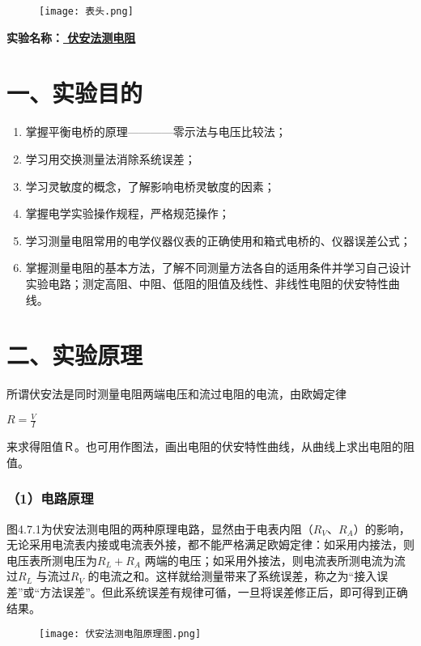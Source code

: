 \documentclass[11pt,a4paper,oneside]{article}
\begin{document}
\begin{figure}[H]
 \centering
  \texttt{[image: 表头.png]}
\end{figure}
\begin{center}
\textbf{{\large 实验名称：\uline{         伏安法测电阻       }}}
\end{center}

\section*{一、实验目的}
\begin{enumerate}
\item 掌握平衡电桥的原理————零示法与电压比较法；
\item 学习用交换测量法消除系统误差；
\item 学习灵敏度的概念，了解影响电桥灵敏度的因素；
\item 掌握电学实验操作规程，严格规范操作；
\item 学习测量电阻常用的电学仪器仪表的正确使用和箱式电桥的、仪器误差公式；
\item 掌握测量电阻的基本方法，了解不同测量方法各自的适用条件并学习自己设计实验电路；测定高阻、中阻、低阻的阻值及线性、非线性电阻的伏安特性曲线。
\end{enumerate}

\section*{二、实验原理}

所谓伏安法是同时测量电阻两端电压和流过电阻的电流，由欧姆定律
\begin{center}
$ R=\displaystyle\frac{V}{I}$
\end{center}
来求得阻值Ｒ。也可用作图法，画出电阻的伏安特性曲线，从曲线上求出电阻的阻值。

\subsubsection*{（1）电路原理}
图4.7.1为伏安法测电阻的两种原理电路，显然由于电表内阻（$R_V$、$R_A$）的影响，无论采用电流表内接或电流表外接，都不能严格满足欧姆定律：如采用内接法，则电压表所测电压为$R_L+R_A$ 两端的电压；如采用外接法，则电流表所测电流为流过$R_L$ 与流过$R_V$ 的电流之和。这样就给测量带来了系统误差，称之为“接入误差”或“方法误差”。但此系统误差有规律可循，一旦将误差修正后，即可得到正确结果。
\begin{figure}[htbp]
\centering
  \texttt{[image: 伏安法测电阻原理图.png]}
\end{figure}
\end{document}
